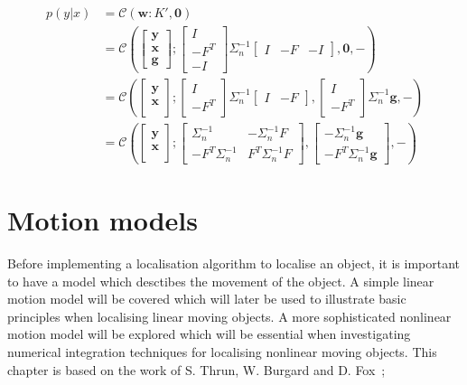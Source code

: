 \documentclass[12pt,oneside,openany,a4paper, %
afrikaans,english,
]{memoir}
\numberwithin{equation}{chapter}
\begin{document}
\begin{equation}
\begin{split}
p(y|x) & = \mathcal{C}(\bm{w}: K', \bm{0})\\
& =\mathcal{C}\left(
\begin{bmatrix}
\bm{y} \\
\bm{x} \\
\bm{g}
\end{bmatrix};
\begin{bmatrix}
I\\
-F^T\\
-I
\end{bmatrix}
\Sigma_n^{-1}
\begin{bmatrix}
I & -F & -I
\end{bmatrix}, \bm{0}, -
\right)\\
& =\mathcal{C}\left(
\begin{bmatrix}
\bm{y} \\
\bm{x} \\
\end{bmatrix};
\begin{bmatrix}
I\\
-F^T
\end{bmatrix}
\Sigma_n^{-1}
\begin{bmatrix}
I & -F
\end{bmatrix},
\begin{bmatrix}
I\\
-F^T
\end{bmatrix}
\Sigma_n^{-1}\bm{g}, -
\right)\\
& =\mathcal{C}\left(
\begin{bmatrix}
\bm{y} \\
\bm{x} \\
\end{bmatrix};
\begin{bmatrix}
\Sigma_n^{-1}  &  -\Sigma_n^{-1}F\\
-F^T\Sigma_n^{-1} & F^T\Sigma_n^{-1}F
\end{bmatrix}
, 
\begin{bmatrix}
-\Sigma_n^{-1}\bm{g}\\
-F^T\Sigma_n^{-1}\bm{g}
\end{bmatrix},
-
\right)
\end{split}
\end{equation}
\chapter{Motion models}
Before implementing a localisation algorithm to localise an object, it is important to have a model which desctibes the movement of the object. A simple linear motion model will be covered which will later be used to illustrate basic principles when localising linear moving objects. A more sophisticated nonlinear motion model will be explored which will be essential when investigating numerical integration techniques for localising nonlinear moving objects. This chapter is based on the work of S. Thrun, W. Burgard and D. Fox~\citep{thrun};
\end{document}
